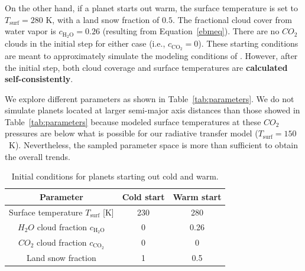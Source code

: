 \documentclass[fleqn,usenatbib]{mnras}
\providecommand{\DIFadd}[1]{{\bf #1}} %
\providecommand{\DIFdel}[1]{} %
\providecommand{\DIFaddbegin}{} %
\providecommand{\DIFaddend}{} %
\providecommand{\DIFdelbegin}{} %
\providecommand{\DIFdelend}{} %
\newcommand{\DIFscaledelfig}{0.5}
\newlength{\DIFdelgraphicswidth} %
\newlength{\DIFdelgraphicsheight} %
\newcommand{\DIFaddincludegraphics}[2][]{{\color{blue}\fbox{\DIFOincludegraphics[#1]{#2}}}} %
\newcommand{\DIFdelincludegraphics}[2][]{%
\sbox{\DIFdelgraphicsbox}{\DIFOincludegraphics[#1]{#2}}%
\settoboxwidth{\DIFdelgraphicswidth}{\DIFdelgraphicsbox} %
\settoboxtotalheight{\DIFdelgraphicsheight}{\DIFdelgraphicsbox} %
\scalebox{\DIFscaledelfig}{%
\parbox[b]{\DIFdelgraphicswidth}{\usebox{\DIFdelgraphicsbox}\\[-\baselineskip] \rule{\DIFdelgraphicswidth}{0em}}\llap{\resizebox{\DIFdelgraphicswidth}{\DIFdelgraphicsheight}{%
\setlength{\unitlength}{\DIFdelgraphicswidth}%
\begin{picture}(1,1)%
\thicklines\linethickness{2pt} %
{\color[rgb]{1,0,0}\put(0,0){\framebox(1,1){}}}%
{\color[rgb]{1,0,0}\put(0,0){\line( 1,1){1}}}%
{\color[rgb]{1,0,0}\put(0,1){\line(1,-1){1}}}%
\end{picture}%
}\hspace*{3pt}}} %
} %
\DeclareRobustCommand{\DIFaddbegin}{\DIFOaddbegin \let\includegraphics\DIFaddincludegraphics} %
\DeclareRobustCommand{\DIFaddend}{\DIFOaddend \let\includegraphics\DIFOincludegraphics} %
\DeclareRobustCommand{\DIFdelbegin}{\DIFOdelbegin \let\includegraphics\DIFdelincludegraphics} %
\DeclareRobustCommand{\DIFdelend}{\DIFOaddend \let\includegraphics\DIFOincludegraphics} %
\begin{document}
On the other hand, if a planet starts out warm, the surface temperature is set to $T_{\mathrm{surf}}=280$ K, with a land snow fraction of $0.5$. The fractional cloud cover from water vapor is $c_{\mathrm{H_{\mathrm{2}}O}}=0.26$ (resulting from Equation~\ref{ebmeq}). 
There are no $CO_{\mathrm{2}}$ clouds in the initial step for either case (i.e., $c_{\mathrm{CO_{\mathrm{2}}}}=0$). These starting conditions are meant to approximately simulate the modeling conditions of \citet{Turbet2017}. However, after the initial step, both cloud coverage and surface temperatures are \DIFdelbegin \DIFdel{self-consistently calculated }\DIFdelend \DIFaddbegin \DIFadd{calculated self-consistently}\DIFaddend . 

\DIFdelbegin \DIFdel{Our modeled $CO_{\mathrm{2}}$ clouds are non-absorbing, and thus radiatively inactive. This is consistent with recent simulations suggesting that their greenhouse effect may be very small in these dense $CO_{\mathrm{2}}$ atmospheres \citep{kitzmann2016}. Even so, our $CO_{\mathrm{2}}$ clouds still impact the planetary albedo, affecting planetary surface temperatures and $CO_{\mathrm{2}}$ precipitation. Following GCM predictions \citep{forget2013}, a 50 percent cloud cover is assumed for $CO_{\mathrm{2}}$ clouds forming within a given latitude band. 
}%

\DIFdelend We explore different parameters as shown in Table~\ref{tab:parameters}. We do not simulate planets located at larger semi-major axis distances than those showed in Table~\ref{tab:parameters} because modeled surface temperatures at these $CO_{\mathrm{2}}$ pressures are below what is possible for our radiative transfer model ($T_{\mathrm{surf}}=150$~K). Nevertheless, the sampled parameter space is more than sufficient to obtain the overall trends.

\begin{table}
	\centering
	\caption{Initial conditions for planets starting out cold and warm.}
	\label{tab:ic}
	\begin{tabular}{ccc} 
		\hline
		Parameter & \textbf{Cold start} & \textbf{Warm start} \\
		\hline
		Surface temperature $T_{\mathrm{surf}}$ [K] & 230 & 280 \\
		$H_{\mathrm{2}}O$ cloud fraction $c_{\mathrm{H_{\mathrm{2}}O}}$ & 0 & 0.26  \\
		$CO_{\mathrm{2}}$ cloud fraction $c_{\mathrm{CO_{\mathrm{2}}}}$ & 0 & 0 \\
		Land snow fraction & 1 & 0.5 \\
		\hline
	\end{tabular}
\end{table}
\end{document}
